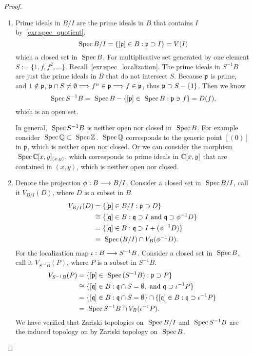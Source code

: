 \begin{proof}
\begin{enumerate}[label=(\alph*)]
\item Prime ideals in $B/I$ are the prime ideals in $B$ that  contains $I$ by~\ref{exr:spec_quotient}.
$$
\text{ Spec\,} B/I=\{[{\mathfrak p}]\in B:{\mathfrak p}\supset I\}=V(I)
$$
which a closed set in $\text{ Spec\,} B$.
For multiplicative set generated by one element $S:=\{1,f,f^2,...\}$. Recall~\ref{exr:spec_localization}. The prime ideals in $S^{-1}B$ are just the prime ideals in $B$ that do not intersect $S$. 
Because ${\mathfrak p}$ is prime, and $1\notin {\mathfrak p}$, ${\mathfrak p}\cap S\neq \emptyset\Longrightarrow f^n\in {\mathfrak p}\Longrightarrow f\in {\mathfrak p}$, thus ${\mathfrak p}\supset S-\{1\}$. Then we know
$$
\text{ Spec\,} S^{-1}B=\text{ Spec\,} B-\{[{\mathfrak p}]\in \text{ Spec\,} B: {\mathfrak p}\ni f\}=D(f),
$$
which is an open set.

In general, $\text{ Spec\,} S^{-1}B$ is neither open nor closed in $\text{ Spec\,} B$. For example consider $\text{ Spec\,}\mathbb Q \subset\text{ Spec\,} \mathbb Z$.
$\text{ Spec\,}\mathbb Q$ corresponds to the generic point $[(0)]$ in ${\mathfrak p}$, which is neither open nor closed. Or we can consider the morphism $\text{ Spec\,} \mathbb C[x,y]_{(x,y)}$, which corresponds to prime ideals in $\mathbb C[x,y]$ that are contained in $(x,y)$, which is neither open nor closed.
\item Denote the projection $\phi:B\longrightarrow B/I$. Consider a closed set in $\text{ Spec\,} B/I$, call it $V_{B/I}(D)$, where $D$ is a subset in $B$.
$$
\begin{aligned}
V_{B/I}(D)&=\{[{\mathfrak p}]\in B/I:{\mathfrak p}\supset D\}\\
&\cong \{[\mathfrak q]\in B:\mathfrak q\supset I\text{ and }\mathfrak q\supset \phi^{-1}D\}\\
&=\{[\mathfrak q]\in B:\mathfrak q\supset I+(\phi^{-1}D)\}\\
&=\text{ Spec\,}(B/I)\cap V_{B}(\phi^{-1}D).
\end{aligned}
$$
For the localization map $\iota:B\longrightarrow S^{-1}B$. Consider a closed set in $\text{ Spec\,} B$, call it $V_{S^{-1}B}(P)$, where $P$ is a subset in $S^{-1}B$.
$$
\begin{aligned}
V_{S^{-1}B}(P)&=\{[{\mathfrak p}]\in \text{ Spec\,} (S^{-1}B):{\mathfrak p}\supset P\}\\
&\cong\{[\mathfrak q]\in B: \mathfrak q\cap S=\emptyset,\text{ and } \mathfrak q\supset \iota^{-1} P\}\\
&=\{[\mathfrak q]\in B: \mathfrak q\cap S=\emptyset\}\cap\{[\mathfrak q]\in B: \mathfrak q\supset \iota^{-1} P\}\\
&=\text{ Spec\,} S^{-1}B\cap V_B(\iota^{-1}P).
\end{aligned}
$$
We have verified that Zariski topologies on $\text{ Spec\,} B/I$ and $\text{ Spec\,} S^{-1}B$ are the induced topology on by Zariski topology on $\text{ Spec\,} B$.
\end{enumerate}
\end{proof}
